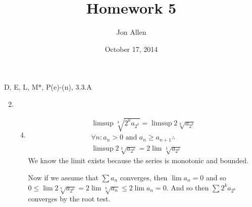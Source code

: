 \documentclass[letterpaper]{article}
\begin{document}
\title{Homework 5}
\date{October 17, 2014}
\author{Jon Allen}
 D, E, L, M*, P(e)-(n), 3.3.A
\renewcommand{\labelenumi}{3.\arabic{enumi}}
\renewcommand{\labelenumii}{\Alph{enumii}.}
\renewcommand{\labelenumiii}{(\alph{enumiii})}
\begin{enumerate}
\setcounter{enumi}{1}
\item
  \begin{enumerate}
  \setcounter{enumii}{3}
  \item
    \begin{align*}
      \limsup \sqrt[k]{2^ka_{2^k}}=\limsup 2\sqrt[k]{a_{2^k}}\\
      \forall n:a_n>0\text{ and }a_n\ge a_{n+1}\therefore\\
      \limsup 2\sqrt[k]{a_{2^k}}=2\lim \sqrt[k]{a_{2^k}}
    \end{align*}
    We know the limit exists because the series is monotonic and bounded.

    Now if we assume that $\sum\limits{a_n}$ converges, then $\lim a_n=0$ and so $0\le\lim 2\sqrt[k]{a_{2^k}}=2\lim\sqrt[k]{a_n}\le2\lim a_n=0$. And so then $\sum\limits{2^ka_{2^k}}$ converges by the root test.


\end{enumerate}
\end{enumerate}
\end{document}
